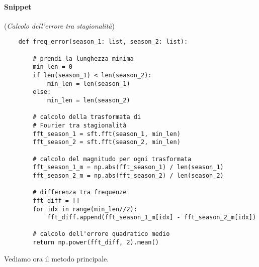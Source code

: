 \paragraph*{Snippet} (\textit{Calcolo dell'errore tra stagionalità})
\begin{verbatim}
    def freq_error(season_1: list, season_2: list):

        # prendi la lunghezza minima 
        min_len = 0
        if len(season_1) < len(season_2):
            min_len = len(season_1)
        else:
            min_len = len(season_2)

        # calcolo della trasformata di 
        # Fourier tra stagionalità
        fft_season_1 = sft.fft(season_1, min_len)
        fft_season_2 = sft.fft(season_2, min_len)

        # calcolo del magnitudo per ogni trasformata
        fft_season_1_m = np.abs(fft_season_1) / len(season_1)
        fft_season_2_m = np.abs(fft_season_2) / len(season_2)

        # differenza tra frequenze
        fft_diff = []
        for idx in range(min_len//2):
            fft_diff.append(fft_season_1_m[idx] - fft_season_2_m[idx])
        
        # calcolo dell'errore quadratico medio
        return np.power(fft_diff, 2).mean() 
\end{verbatim}


Vediamo ora il metodo principale.
